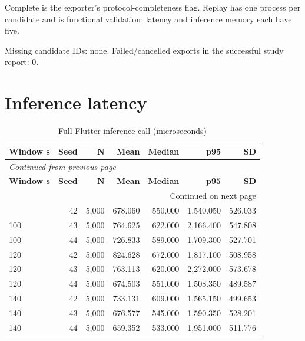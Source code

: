 \documentclass[10pt,a4paper]{article}
\begin{document}
\noindent\small Complete is the exporter's protocol-completeness flag. Replay has one process per candidate and is functional validation; latency and inference memory each have five.\normalsize\par\medskip
Missing candidate IDs:\allowbreak{} none. Failed/\allowbreak{}cancelled exports in the successful study report:\allowbreak{} 0.

\section{Inference latency}
\begingroup\small\setlength{\tabcolsep}{4pt}\renewcommand{\arraystretch}{1.12}
\begin{longtable}{@{}lrrrrrr@{}}
\caption{Full Flutter inference call (microseconds)}\\
\toprule
\textbf{Window s} & \textbf{Seed} & \textbf{N} & \textbf{Mean} & \textbf{Median} & \textbf{p95} & \textbf{SD} \\
\midrule\endfirsthead
\multicolumn{7}{l}{\small\itshape Continued from previous page}\\
\toprule
\textbf{Window s} & \textbf{Seed} & \textbf{N} & \textbf{Mean} & \textbf{Median} & \textbf{p95} & \textbf{SD} \\
\midrule\endhead
\midrule\multicolumn{7}{r}{\small Continued on next page}\\\endfoot
\bottomrule\endlastfoot
100 & 42 & 5,000 & 678.060 & 550.000 & 1,540.050 & 526.033 \\
100 & 43 & 5,000 & 764.625 & 622.000 & 2,166.400 & 547.808 \\
100 & 44 & 5,000 & 726.833 & 589.000 & 1,709.300 & 527.701 \\
120 & 42 & 5,000 & 824.628 & 672.000 & 1,817.100 & 508.958 \\
120 & 43 & 5,000 & 763.113 & 620.000 & 2,272.000 & 573.678 \\
120 & 44 & 5,000 & 674.503 & 551.000 & 1,508.350 & 489.587 \\
140 & 42 & 5,000 & 733.131 & 609.000 & 1,565.150 & 499.653 \\
140 & 43 & 5,000 & 676.577 & 545.000 & 1,590.350 & 528.201 \\
140 & 44 & 5,000 & 659.352 & 533.000 & 1,951.000 & 511.776 \\
\end{longtable}\endgroup
\begingroup\small\setlength{\tabcolsep}{4pt}\renewcommand{\arraystretch}{1.12}
\end{document}
